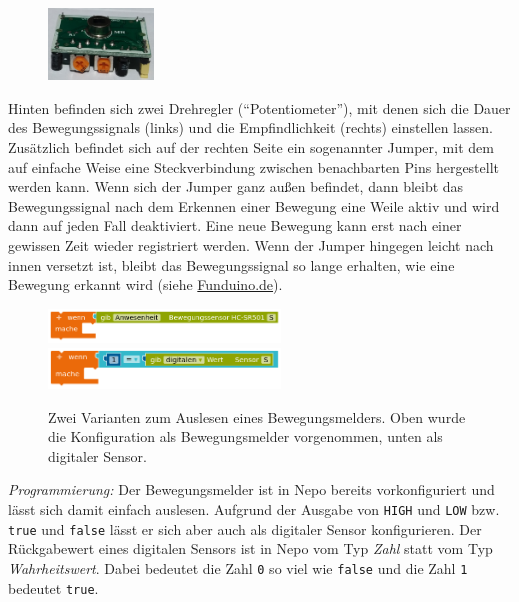 \begin{figure}
	\centering
	\vspace{-0.75\baselineskip}
	\includegraphics[width=0.25\textwidth]{pics/bewegungsmelder-hinten.jpg}
	\vspace{-\baselineskip}
	\label{abb:bewegungsmelder-hinten2}
\end{figure}
Hinten befinden sich zwei Drehregler (\enquote{Potentiometer}), mit denen sich die Dauer des Bewegungssignals (links) und die Empfindlichkeit (rechts) einstellen lassen. Zusätzlich befindet sich auf der rechten Seite ein sogenannter Jumper, mit dem auf einfache Weise eine Steckverbindung zwischen benachbarten Pins hergestellt werden kann. Wenn sich der Jumper ganz außen befindet, dann bleibt das Bewegungssignal nach dem Erkennen einer Bewegung eine Weile aktiv und wird dann auf jeden Fall deaktiviert. Eine neue Bewegung kann erst nach einer gewissen Zeit wieder registriert werden. Wenn der Jumper hingegen leicht nach innen versetzt ist, bleibt das Bewegungssignal so lange erhalten, wie eine Bewegung erkannt wird (siehe \href{https://funduino.de/nr-8-bewegungsmelder}{Funduino.de}).

\bigskip

\begin{figure}
	\centering
	\includegraphics[width=0.55\textwidth]{./pics/bewegungsmelder-auslesen.png}
	\includegraphics[width=0.55\textwidth]{./pics/digitalen-sensor-auslesen.png}
	\caption{Zwei Varianten zum Auslesen eines Bewegungsmelders. Oben wurde die Konfiguration als Bewegungsmelder vorgenommen, unten als digitaler Sensor.}
\end{figure}
\emph{Programmierung:} Der Bewegungsmelder ist in Nepo bereits vorkonfiguriert und lässt sich damit einfach auslesen. Aufgrund der Ausgabe von \texttt{HIGH} und \texttt{LOW} bzw. \texttt{true} und \texttt{false} lässt er sich aber auch als digitaler Sensor konfigurieren. Der Rückgabewert eines digitalen Sensors ist in Nepo vom Typ \emph{Zahl} statt vom Typ \emph{Wahrheitswert}. Dabei bedeutet die Zahl \texttt{0} so viel wie \texttt{false} und die Zahl \texttt{1} bedeutet \texttt{true}.

